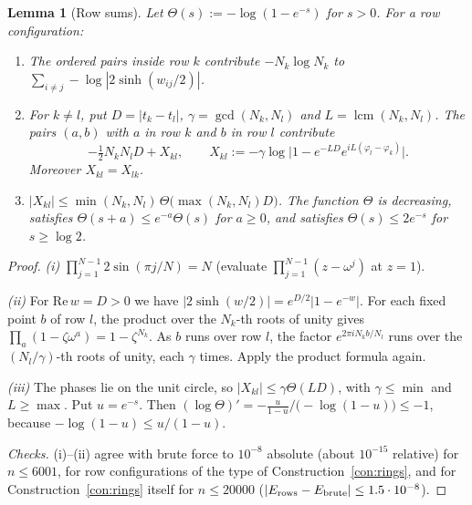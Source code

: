 \documentclass[11pt]{article}
\newtheorem{lemma}[theorem]{Lemma}
\theoremstyle{definition}
\theoremstyle{remark}
\begin{document}
\begin{lemma}[Row sums]\label{lem:rowsums}
Let $\Theta(s):=-\log(1-e^{-s})$ for $s>0$. For a row configuration:
\begin{enumerate}[label=(\roman*)]
\item The ordered pairs inside row $k$ contribute $-N_k\log N_k$ to
  $\sum_{i\ne j}-\log|2\sinh(w_{ij}/2)|$.
\item For $k\ne l$, put $D=|t_k-t_l|$, $\gamma=\gcd(N_k,N_l)$ and $L=\operatorname{lcm}(N_k,N_l)$.
  The pairs $(a,b)$ with $a$ in row $k$ and $b$ in row $l$ contribute
  \[
  -\tfrac12N_kN_lD+X_{kl},\qquad
  X_{kl}:=-\gamma\log\bigl|1-e^{-LD}e^{iL(\varphi_l-\varphi_k)}\bigr| .
  \]
  Moreover $X_{kl}=X_{lk}$.
\item $|X_{kl}|\le\min(N_k,N_l)\,\Theta\bigl(\max(N_k,N_l)D\bigr)$. The function $\Theta$ is
  decreasing, satisfies $\Theta(s+a)\le e^{-a}\Theta(s)$ for $a\ge0$, and satisfies
  $\Theta(s)\le2e^{-s}$ for $s\ge\log2$.
\end{enumerate}
\end{lemma}
\begin{proof}
\emph{(i)} $\prod_{j=1}^{N-1}2\sin(\pi j/N)=N$ (evaluate $\prod_{j=1}^{N-1}(z-\omega^j)$ at $z=1$).

\emph{(ii)} For $\mathrm{Re}\,w=D>0$ we have $|2\sinh(w/2)|=e^{D/2}|1-e^{-w}|$. For each
fixed point $b$ of row $l$, the product over the $N_k$-th roots of unity gives
$\prod_a(1-\zeta\omega^a)=1-\zeta^{N_k}$. As $b$ runs over row $l$, the factor
$e^{2\pi iN_kb/N_l}$ runs over the $(N_l/\gamma)$-th roots of unity, each $\gamma$ times. Apply
the product formula again.

\emph{(iii)} The phases lie on the unit circle, so $|X_{kl}|\le\gamma\Theta(LD)$, with $\gamma\le\min$ and $L\ge\max$.
Put $u=e^{-s}$. Then
$(\log\Theta)'=-\frac{u}{1-u}\big/\bigl(-\log(1-u)\bigr)\le-1$, because $-\log(1-u)\le u/(1-u)$.

\emph{Checks.} (i)--(ii) agree with brute force to $10^{-8}$ absolute (about $10^{-15}$ relative)
for $n\le6001$, for row configurations of the type of Construction~\ref{con:rings}, and for
Construction~\ref{con:rings} itself for $n\le20000$ ($|E_{\rm rows}-E_{\rm brute}|\le1.5\cdot10^{-8}$).
\end{proof}
\end{document}
